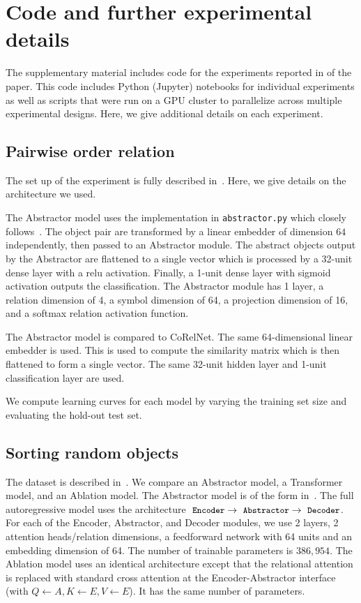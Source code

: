 \section{Code and further experimental details}
\label{sec:code}

The supplementary material includes code for the experiments reported in  of the paper. This code includes Python (Jupyter) notebooks for individual experiments as well as scripts that were run on a GPU cluster to parallelize across multiple experimental designs. Here, we give additional details on each experiment.

\subsection{Pairwise order relation}\label{ssec:supp_exp_pairwise_order}
The set up of the experiment is fully described in~. Here, we give details on the architecture we used.

The Abstractor model uses the implementation in \texttt{abstractor.py} which closely follows~. The object pair are transformed by a linear embedder of dimension $64$ independently, then passed to an Abstractor module. The abstract objects output by the Abstractor are flattened to a single vector which is processed by a 32-unit dense layer with a relu activation. Finally, a 1-unit dense layer with sigmoid activation outputs the classification. The Abstractor module has 1 layer, a relation dimension of 4, a symbol dimension of 64, a projection dimension of 16, and a softmax relation activation function.

The Abstractor model is compared to CoRelNet. The same 64-dimensional linear embedder is used. This is used to compute the similarity matrix which is then flattened to form a single vector. The same 32-unit hidden layer and 1-unit classification layer are used.

We compute learning curves for each model by varying the training set size and evaluating the hold-out test set.

\subsection{Sorting random objects}\label{ssec:supp_exp_object_sorting}

The dataset is described in~. We compare an Abstractor model, a Transformer model, and an Ablation model. The Abstractor model is of the form in~. The full autoregressive model uses the architecture $\module{Encoder} \to \module{Abstractor} \to \module{Decoder}$. For each of the Encoder, Abstractor, and Decoder modules, we use 2 layers, 2 attention heads/relation dimensions, a feedforward network with 64 units and an embedding dimension of 64. The number of trainable parameters is $386,954$. The Ablation model uses an identical architecture except that the relational attention is replaced with standard cross attention at the Encoder-Abstractor interface (with $Q \gets A, K \gets E, V \gets E$). It has the same number of parameters.

